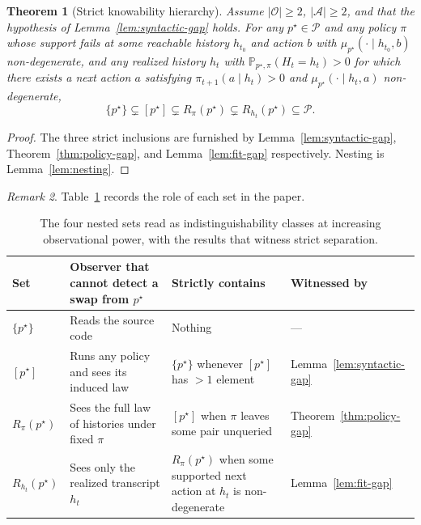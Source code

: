 \documentclass[11pt]{article}
\newtheorem{theorem}{Theorem}[section]
\theoremstyle{definition}
\theoremstyle{remark}
\newtheorem{remark}[theorem]{Remark}
\newcommand{\Acal}{\mathcal{A}}
\newcommand{\Ocal}{\mathcal{O}}
\newcommand{\Pcal}{\mathcal{P}}
\newcommand{\Prob}{\mathbb{P}}
\begin{document}
\begin{theorem}[Strict knowability hierarchy]
\label{thm:strict-hierarchy}
Assume $|\Ocal|\ge 2$, $|\Acal|\ge 2$, and that the hypothesis of Lemma~\ref{lem:syntactic-gap} holds. For any $p^\star\in\Pcal$ and any policy $\pi$ whose support fails at some reachable history $h_{t_0}$ and action $b$ with $\mu_{p^\star}(\cdot\mid h_{t_0},b)$ non-degenerate, and any realized history $h_t$ with $\Prob_{p^\star,\pi}(H_t=h_t)>0$ for which there exists a next action $a$ satisfying $\pi_{t+1}(a\mid h_t)>0$ and $\mu_{p^\star}(\cdot\mid h_t,a)$ non-degenerate,
\[
\{p^\star\}\subsetneq [p^\star]\subsetneq R_\pi(p^\star)\subsetneq R_{h_t}(p^\star)\subseteq \Pcal.
\]
\end{theorem}

\begin{proof}
The three strict inclusions are furnished by Lemma~\ref{lem:syntactic-gap}, Theorem~\ref{thm:policy-gap}, and Lemma~\ref{lem:fit-gap} respectively. Nesting is Lemma~\ref{lem:nesting}.
\end{proof}

\begin{remark}
Table~\ref{tab:hierarchy} records the role of each set in the paper.
\end{remark}

\begin{table}[ht]
\centering
\small
\caption{The four nested sets read as indistinguishability classes at increasing observational power, with the results that witness strict separation.}
\label{tab:hierarchy}
\begin{tabularx}{\textwidth}{@{}>{\raggedright\arraybackslash}p{}>{\raggedright\arraybackslash}p{}>{\raggedright\arraybackslash}X>{\raggedright\arraybackslash}p{}@{}}
\toprule
\textbf{Set} & \textbf{Observer that cannot detect a swap from $p^\star$} & \textbf{Strictly contains} & \textbf{Witnessed by} \\
\midrule
$\{p^\star\}$ & Reads the source code & Nothing & --- \\
$[p^\star]$ & Runs any policy and sees its induced law & $\{p^\star\}$ whenever $[p^\star]$ has $>1$ element & Lemma~\ref{lem:syntactic-gap} \\
$R_\pi(p^\star)$ & Sees the full law of histories under fixed $\pi$ & $[p^\star]$ when $\pi$ leaves some pair unqueried & Theorem~\ref{thm:policy-gap} \\
$R_{h_t}(p^\star)$ & Sees only the realized transcript $h_t$ & $R_\pi(p^\star)$ when some supported next action at $h_t$ is non-degenerate & Lemma~\ref{lem:fit-gap} \\
\bottomrule
\end{tabularx}
\end{table}
\end{document}
